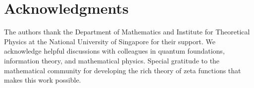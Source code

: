 \documentclass[11pt]{article}
\theoremstyle{plain}
\theoremstyle{definition}
\theoremstyle{remark}
\begin{document}
\section*{Acknowledgments}

The authors thank the Department of Mathematics and Institute for Theoretical Physics at the National University of Singapore for their support. We acknowledge helpful discussions with colleagues in quantum foundations, information theory, and mathematical physics. Special gratitude to the mathematical community for developing the rich theory of zeta functions that makes this work possible.



\end{document}
